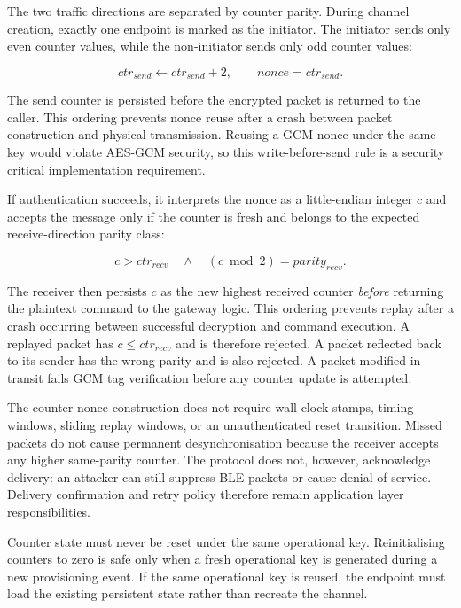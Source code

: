 \documentclass[journal]{IEEEtran}
\begin{document}
The two traffic directions are separated by counter parity. During channel creation, exactly one endpoint is marked as the initiator. The initiator sends only even counter values, while the non-initiator sends only odd counter values:

\begin{equation}
\mathit{ctr}_{send} \leftarrow \mathit{ctr}_{send} + 2,
\qquad
\mathit{nonce} = \mathit{ctr}_{send}.
\label{eq:sendcounter}
\end{equation}

\noindent The send counter is persisted before the encrypted packet is returned to the caller. This ordering prevents nonce reuse after a crash between packet construction and physical transmission. Reusing a GCM nonce under the same key would violate AES-GCM security, so this write-before-send rule is a security critical implementation requirement.

If authentication succeeds, it interprets the nonce as a little-endian integer $c$ and accepts the message only if the counter is fresh and belongs to the expected receive-direction parity class:

\begin{equation}
c > \mathit{ctr}_{recv}
\quad\land\quad
(c \bmod 2) = \mathit{parity}_{recv}.
\label{eq:counteraccept}
\end{equation}

\noindent The receiver then persists $c$ as the new highest received counter \emph{before} returning the plaintext command to the gateway logic. This ordering prevents replay after a crash occurring between successful decryption and command execution. A replayed packet has $c \leq \mathit{ctr}_{recv}$ and is therefore rejected. A packet reflected back to its sender has the wrong parity and is also rejected. A packet modified in transit fails GCM tag verification before any counter update is attempted.

The counter-nonce construction does not require wall clock stamps, timing windows, sliding replay windows, or an unauthenticated reset transition. Missed packets do not cause permanent desynchronisation because the receiver accepts any higher same-parity counter. The protocol does not, however, acknowledge delivery: an attacker can still suppress BLE packets or cause denial of service. Delivery confirmation and retry policy therefore remain application layer responsibilities.

Counter state must never be reset under the same operational key. Reinitialising counters to zero is safe only when a fresh operational key is generated during a new provisioning event. If the same operational key is reused, the endpoint must load the existing persistent state rather than recreate the channel.
\end{document}
